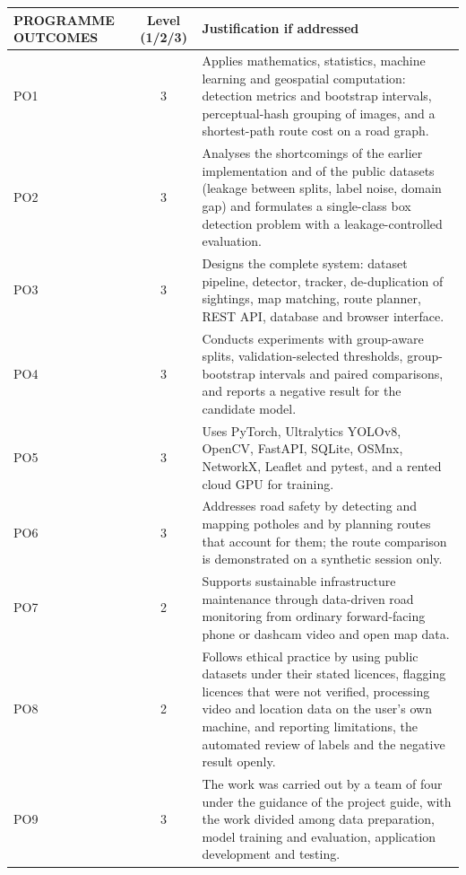 \begin{table}[H]
\centering
{}
\footnotesize
\renewcommand{\arraystretch}{1.1}
\setlength{\tabcolsep}{5pt}
\begin{tabular}{|p{2.7cm}|c|p{8.9cm}|}
\hline
\textbf{PROGRAMME OUTCOMES} & \textbf{Level (1/2/3)} & \textbf{Justification if addressed} \\
\hline
PO1 & 3 & Applies mathematics, statistics, machine learning and geospatial computation: detection metrics and bootstrap intervals, perceptual-hash grouping of images, and a shortest-path route cost on a road graph. \\
\hline
PO2 & 3 & Analyses the shortcomings of the earlier implementation and of the public datasets (leakage between splits, label noise, domain gap) and formulates a single-class box detection problem with a leakage-controlled evaluation. \\
\hline
PO3 & 3 & Designs the complete system: dataset pipeline, detector, tracker, de-duplication of sightings, map matching, route planner, REST API, database and browser interface. \\
\hline
PO4 & 3 & Conducts experiments with group-aware splits, validation-selected thresholds, group-bootstrap intervals and paired comparisons, and reports a negative result for the candidate model. \\
\hline
PO5 & 3 & Uses PyTorch, Ultralytics YOLOv8, OpenCV, FastAPI, SQLite, OSMnx, NetworkX, Leaflet and pytest, and a rented cloud GPU for training. \\
\hline
PO6 & 3 & Addresses road safety by detecting and mapping potholes and by planning routes that account for them; the route comparison is demonstrated on a synthetic session only. \\
\hline
PO7 & 2 & Supports sustainable infrastructure maintenance through data-driven road monitoring from ordinary forward-facing phone or dashcam video and open map data. \\
\hline
PO8 & 2 & Follows ethical practice by using public datasets under their stated licences, flagging licences that were not verified, processing video and location data on the user's own machine, and reporting limitations, the automated review of labels and the negative result openly. \\
\hline
PO9 & 3 & The work was carried out by a team of four under the guidance of the project guide, with the work divided among data preparation, model training and evaluation, application development and testing. \\

\end{tabular}
\end{table}
